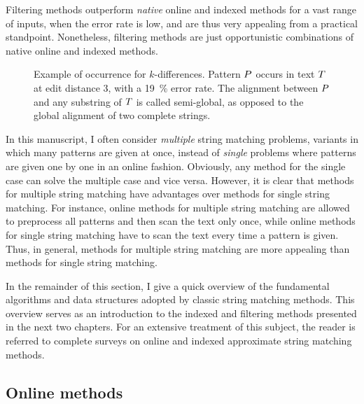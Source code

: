 Filtering methods outperform \emph{native} online and indexed methods for a vast range of inputs, \ie when the error rate is low, and are thus very appealing from a practical standpoint.
Nonetheless, filtering methods are just opportunistic combinations of native online and indexed methods.

\begin{figure}[t]
\begin{center}
\caption[$k$-Differences occurrence]{Example of occurrence for $k$-differences. Pattern $P$ occurs in text $T$ at edit distance 3, \ie with a 19~\% error rate.
The alignment between $P$ and any substring of $T$ is called semi-global, as opposed to the global alignment of two complete strings.
}
\label{fig:edit-occurrence}

\end{center}
\end{figure}

In this manuscript, I often consider \emph{multiple} string matching problems, \ie variants in which many patterns are given at once, instead of \emph{single} problems where patterns are given one by one in an online fashion.
Obviously, any method for the single case can solve the multiple case and vice versa.
However, it is clear that methods for multiple string matching have advantages over methods for single string matching.
For instance, online methods for multiple string matching are allowed to preprocess all patterns and then scan the text only once, while online methods for single string matching have to scan the text every time a pattern is given.
Thus, in general, methods for multiple string matching are more appealing than methods for single string matching.

In the remainder of this section, I give a quick overview of the fundamental algorithms and data structures adopted by classic string matching methods.
This overview serves as an introduction to the indexed and filtering methods presented in the next two chapters.
For an extensive treatment of this subject, the reader is referred to complete surveys on online \citep{Navarro2001a} and indexed \citep{Navarro2001} approximate string matching methods.


\subsection{Online methods}
\label{sub:introonline}


